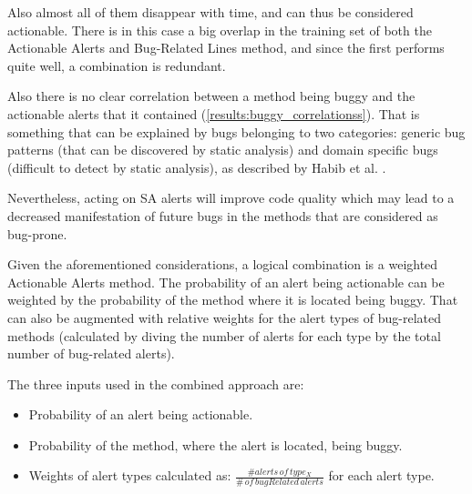 Also almost all of them disappear with time, and can thus be considered actionable. There is in this case a big overlap in the training set of both the Actionable Alerts and Bug-Related Lines method, and since the first performs quite well, a combination is redundant. 

Also there is no clear correlation between a method being buggy and the actionable alerts that it contained (\cref{results:buggy_correlationss}). That is something that can be explained by bugs belonging to two categories: generic bug patterns (that can be discovered by static analysis) and domain specific bugs (difficult to detect by static analysis), as described by Habib et al. \cite{how_many_bugs}.

Nevertheless, acting on SA alerts will improve code quality which may lead to a decreased manifestation of future bugs in the methods that are considered as bug-prone.

Given the aforementioned considerations, a logical combination is a weighted Actionable Alerts method. The probability of an alert being actionable can be weighted by the probability of the method where it is located being buggy. That can also be augmented with relative weights for the alert types of bug-related methods (calculated by diving the number of alerts for each type by the total number of bug-related alerts).

The three inputs used in the combined approach are:
\begin{itemize}
	\item Probability of an alert being actionable.
	\item Probability of the method, where the alert is located, being buggy.
	\item Weights of alert types calculated as: $\frac{\#alerts \, of \, type_X}{\# \, of \, bugRelated \, alerts}$ for each alert type.
\end{itemize}

